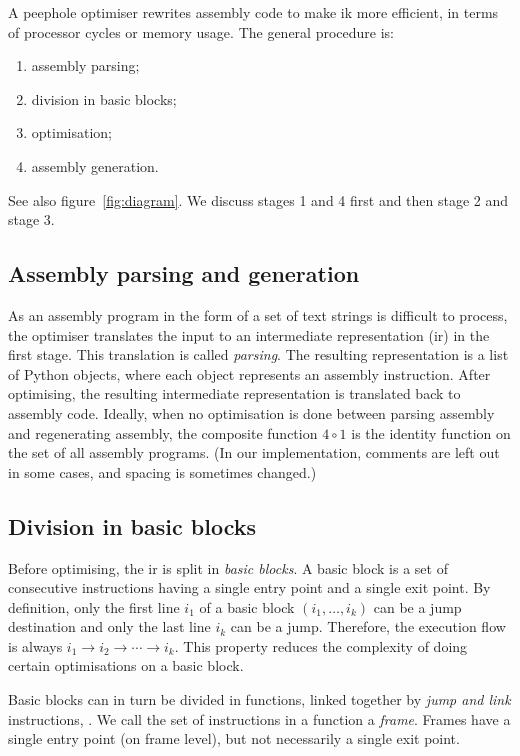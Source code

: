 A peephole optimiser rewrites assembly code to make ik more efficient, in terms of processor cycles or memory usage. The general procedure is:
\begin{enumerate}
\item assembly parsing;
\item division in basic blocks;
\item optimisation;
\item assembly generation.
\end{enumerate}
See also figure~\ref{fig:diagram}. We discuss stages 1 and 4 first and then stage 2 and stage 3.

\subsection*{Assembly parsing and generation}
As an assembly program in the form of a set of text strings is difficult to process, the optimiser translates the input to an intermediate representation (ir) in the first stage. This translation is called \emph{parsing}. The resulting representation is a list of Python objects, where each object represents an assembly instruction. After optimising, the resulting intermediate representation is translated back to assembly code. Ideally, when no optimisation is done between parsing assembly and regenerating assembly, the composite function $4\circ 1$ is the identity function on the set of all assembly programs. (In our implementation, comments are left out in some cases, and spacing is sometimes changed.)

\subsection*{Division in basic blocks}
Before optimising, the ir is split in \emph{basic blocks}. A basic block is a set of consecutive instructions having a single entry point and a single exit point. By definition, only the first line $i_1$ of a basic block $(i_1, \ldots, i_k)$ can be a jump destination and only the last line $i_k$ can be a jump. Therefore, the execution flow is always $i_1\rightarrow i_2 \rightarrow \cdots \rightarrow i_k$. This property reduces the complexity of doing certain optimisations on a basic block.

Basic blocks can in turn be divided in functions, linked together by \emph{jump and link} instructions, . We call the set of instructions in a function a \emph{frame}. Frames have a single entry point (on frame level), but not necessarily a single exit point.

